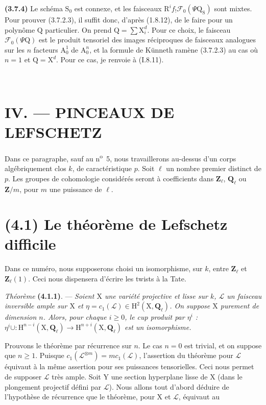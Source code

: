 \documentclass[11pt,leqno]{article}
\newcommand{\Page}[1]{\ifvmode\noindent\else\unskip\ \fi{\footnotesize\textcolor{gray}{[p.\,#1]}}\ \ignorespaces}
\begin{document}
\textbf{(3.7.4)} Le schéma \(\mathrm S_0\) est connexe, et les faisceaux \(\mathrm R^if_!\mathscr F_0(\Psi\mathrm Q_{\mathrm S})\) sont mixtes. Pour prouver (3.7.2.3), il suffit donc, d’après (1.8.12), de le faire pour un polynôme \(\mathrm Q\) particulier. On prend \(\mathrm Q=\sum\mathrm X_i^d\). Pour ce choix, le faisceau \(\mathscr F_0(\Psi\mathrm Q)\) est le produit tensoriel des images réciproques de faisceaux analogues sur les \(n\) facteurs \(\mathrm A_0^1\) de \(\mathrm A_0^n\), et la formule de Künneth ramène (3.7.2.3) au cas où \(n=1\) et \(\mathrm Q=\mathrm X^d\). Pour ce cas, je renvoie à (I.8.11).

\Page{217}
\section*{IV. — PINCEAUX DE LEFSCHETZ}

Dans ce paragraphe, sauf au n\textsuperscript{o}~5, nous travaillerons au-dessus d’un corps algébriquement clos \(k\), de caractéristique \(p\). Soit \(\ell\) un nombre premier distinct de \(p\). Les groupes de cohomologie considérés seront à coefficients dans \(\mathbf{Z}_\ell\), \(\mathbf{Q}_\ell\) ou \(\mathbf{Z}/m\), pour \(m\) une puissance de \(\ell\).

\section*{(4.1) Le théorème de Lefschetz difficile}

Dans ce numéro, nous supposerons choisi un isomorphisme, sur \(k\), entre \(\mathbf{Z}_\ell\) et \(\mathbf{Z}_\ell(1)\). Ceci nous dispensera d’écrire les twists à la Tate.

\textit{Théorème} \textbf{(4.1.1)}. — \textit{Soient \(\mathrm{X}\) une variété projective et lisse sur \(k\), \(\mathscr{L}\) un faisceau inversible ample sur \(\mathrm{X}\) et \(\eta=c_1(\mathscr{L})\in\mathrm{H}^2(\mathrm{X},\mathbf{Q}_\ell)\). On suppose \(\mathrm{X}\) purement de dimension \(n\). Alors, pour chaque \(i\geq0\), le cup produit par \(\eta^i\) : \(\eta^i\cup:\mathrm{H}^{n-i}(\mathrm{X},\mathbf{Q}_\ell)\to\mathrm{H}^{n+i}(\mathrm{X},\mathbf{Q}_\ell)\) est un isomorphisme.}

Prouvons le théorème par récurrence sur \(n\). Le cas \(n=0\) est trivial, et on suppose que \(n\geq1\). Puisque \(c_1(\mathscr{L}^{\otimes m})=mc_1(\mathscr{L})\), l’assertion du théorème pour \(\mathscr{L}\) équivaut à la même assertion pour ses puissances tensorielles. Ceci nous permet de supposer \(\mathscr{L}\) très ample. Soit \(\mathrm{Y}\) une section hyperplane lisse de \(\mathrm{X}\) (dans le plongement projectif défini par \(\mathscr{L}\)). Nous allons tout d’abord déduire de l’hypothèse de récurrence que le théorème, pour \(\mathrm{X}\) et \(\mathscr{L}\), équivaut au
\end{document}
